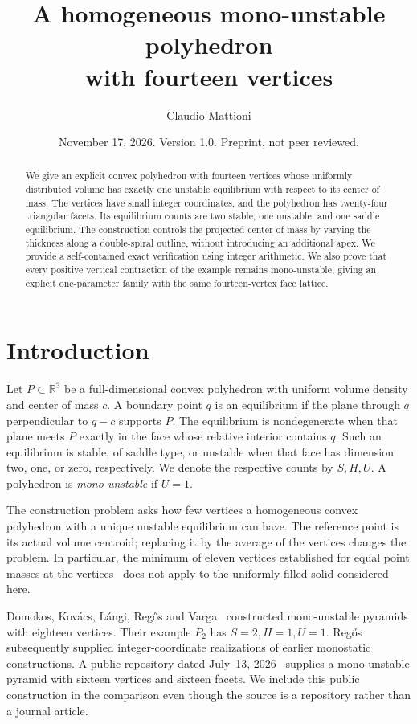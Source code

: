 \documentclass[11pt]{amsart}
\title[A mono-unstable polyhedron with fourteen vertices]{A homogeneous mono-unstable polyhedron\\with fourteen vertices}
\author{Claudio Mattioni}
\date{November 17, 2026. Version 1.0. Preprint, not peer reviewed.}
\theoremstyle{remark}
\newcommand{\R}{\mathbb R}
\begin{document}
\begin{abstract}
We give an explicit convex polyhedron with fourteen vertices whose uniformly distributed volume has exactly one unstable equilibrium with respect to its center of mass. The vertices have small integer coordinates, and the polyhedron has twenty-four triangular facets. Its equilibrium counts are two stable, one unstable, and one saddle equilibrium. The construction controls the projected center of mass by varying the thickness along a double-spiral outline, without introducing an additional apex. We provide a self-contained exact verification using integer arithmetic. We also prove that every positive vertical contraction of the example remains mono-unstable, giving an explicit one-parameter family with the same fourteen-vertex face lattice.
\end{abstract}
\maketitle

\section{Introduction}\label{sec:intro}

Let $P\subset\R^3$ be a full-dimensional convex polyhedron with uniform volume density and center of mass $c$. A boundary point $q$ is an equilibrium if the plane through $q$ perpendicular to $q-c$ supports $P$. The equilibrium is nondegenerate when that plane meets $P$ exactly in the face whose relative interior contains $q$. Such an equilibrium is stable, of saddle type, or unstable when that face has dimension two, one, or zero, respectively. We denote the respective counts by $S,H,U$. A polyhedron is \emph{mono-unstable} if $U=1$.

The construction problem asks how few vertices a homogeneous convex polyhedron with a unique unstable equilibrium can have. The reference point is its actual volume centroid; replacing it by the average of the vertices changes the problem. In particular, the minimum of eleven vertices established for equal point masses at the vertices~\cite{PRDB23} does not apply to the uniformly filled solid considered here.

Domokos, Kov\'acs, L\'angi, Reg\H{o}s and Varga~\cite[Section~4.2]{DKLRV20} constructed mono-unstable pyramids with eighteen vertices. Their example $P_2$ has $S=2,H=1,U=1$. Reg\H{o}s~\cite{Reg25} subsequently supplied integer-coordinate realizations of earlier monostatic constructions. A public repository dated July~13, 2026~\cite{Public16} supplies a mono-unstable pyramid with sixteen vertices and sixteen facets. We include this public construction in the comparison even though the source is a repository rather than a journal article.
\end{document}

